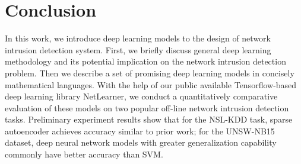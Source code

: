 \section{Conclusion}
In this work, we introduce deep learning models to the design of network intrusion detection system.
First, we briefly discuss general deep learning methodology and
its potential implication on the network intrusion detection problem.
Then we describe a set of promising deep learning models in concisely mathematical languages.
With the help of our public available Tensorflow-based deep learning library NetLearner,
we conduct a quantitatively comparative evaluation of these models on two popular
off-line network intrusion detection tasks. 
Preliminary experiment results show that for the NSL-KDD task, sparse autoencoder achieves accuracy similar to prior work;
for the UNSW-NB15 dataset, deep neural network models with greater generalization capability commonly have better accuracy than SVM.
